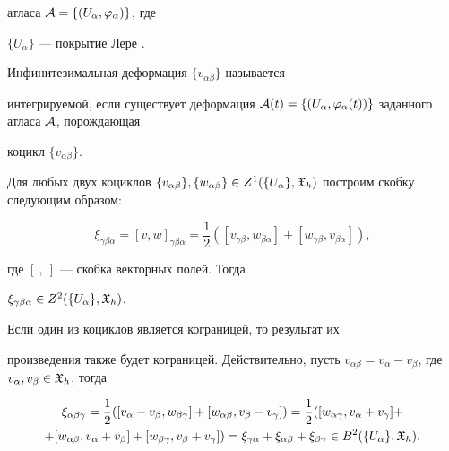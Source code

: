 атласа ${\cal  A}=\{(U_{\alpha},  \varphi _{\alpha})\}$,  где


$\{U_{\alpha}\}$ --- покрытие Лере \cite{Wells}.





\begin{defn}


Инфинитезимальная деформация $\{v_{\alpha\beta}\}$   называется


интегрируемой, если существует деформация ${\cal A}(t)=\{(U_{\alpha},


\varphi_{\alpha}(t))\}$ заданного атласа ${\cal A}$, порождающая


коцикл $\{v_{\alpha \beta}\}$.


\end{defn}





Для любых двух коциклов $\{v_{\alpha \beta}\}, \{w_{\alpha \beta}\} \in


Z^1(\{U_{\alpha}\}, {\frak X}_h)$ построим скобку следующим образом:


$$


\xi_{\gamma \beta \alpha}=[v,w]_{\gamma \beta \alpha}=\frac12([v_{\gamma


\beta},w_{\beta \alpha}]+[w_{\gamma \beta},v_{\beta \alpha}]),


$$


где $[\ , \ ]$ --- скобка векторных полей. Тогда


$\xi_{\gamma \beta \alpha}\in Z^2 (\{U_{\alpha}\}, {\frak X}_h)$.





Если один из коциклов является кограницей, то результат их


произведения также будет кограницей. Действительно, пусть $v_{\alpha


\beta}=v_{\alpha} - v_{\beta} $, где $v_{\alpha}, v_{\beta} \in


{\frak X}_{h}$, тогда


\begin{multline*}


\xi_{\alpha \beta \gamma}=\frac{1}{2} ([v_{\alpha} - v_{\beta},


w_{\beta \gamma}] + [w_{\alpha \beta}, v_{\beta} - v_{\gamma}]) =


\frac{1}{2} ([w_{\alpha \gamma}, v_{\alpha} + v_{\gamma}] + \\


%


+ [w_{\alpha \beta}, v_{\alpha} + v_{\beta}] + [w_{\beta \gamma},


v_{\beta} + v_{\gamma}])=\xi_{\gamma \alpha} + \xi_{\alpha \beta}


+ \xi_{\beta \gamma} \in B^2 (\{U_{\alpha} \}, {\frak X}_{h}).


\end{multline*}


